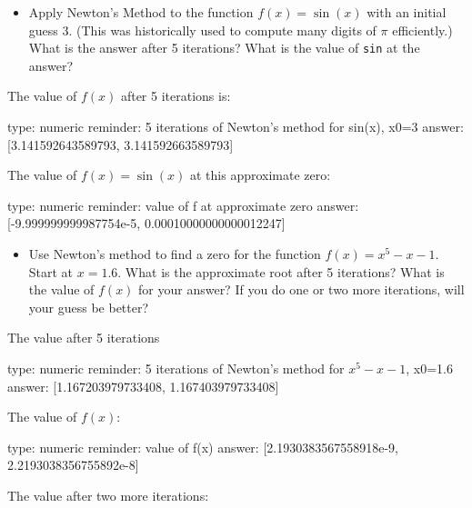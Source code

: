 \documentclass[12pt]{article}
\begin{document}
\begin{itemize}
\itemsep1pt\parskip0pt
\item
  Apply Newton's Method to the function $f(x) = \sin(x)$ with an initial
  guess $3$. (This was historically used to compute many digits of $\pi$
  efficiently.) What is the answer after 5 iterations? What is the value
  of \texttt{sin} at the answer?
\end{itemize}

The value of $f(x)$ after 5 iterations is:

\begin{answer}
    type: numeric
    reminder: 5 iterations of Newton's method for sin(x), x0=3
    answer: [3.141592643589793, 3.141592663589793]

\end{answer}

The value of $f(x)=\sin(x)$ at this approximate zero:

\begin{answer}
    type: numeric
    reminder: value of f at approximate zero
    answer: [-9.999999999987754e-5, 0.00010000000000012247]

\end{answer}

\begin{itemize}
\itemsep1pt\parskip0pt
\item
  Use Newton's method to find a zero for the function $f(x)=x^5-x-1$.
  Start at $x=1.6$. What is the approximate root after 5 iterations?
  What is the value of $f(x)$ for your answer? If you do one or two more
  iterations, will your guess be better?
\end{itemize}

The value after 5 iterations

\begin{answer}
    type: numeric
    reminder: 5 iterations of Newton's method for \( x^5 -x - 1 \), x0=1.6
    answer: [1.167203979733408, 1.167403979733408]

\end{answer}

The value of $f(x)$:

\begin{answer}
    type: numeric
    reminder: value of f(x)
    answer: [2.1930383567558918e-9, 2.2193038356755892e-8]

\end{answer}

The value after two more iterations:
\end{document}
